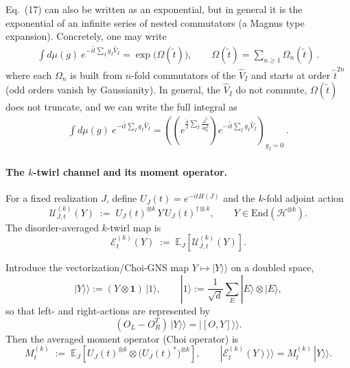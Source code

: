 \documentclass{article}
\theoremstyle{definition}
\newcommand{\lb}{\left(}
\newcommand{\rb}{\right)}
\newcommand{\p}{\partial}
\begin{document}
    Eq.~(17) can also be written as an exponential, but in general it is the exponential
    of an infinite series of nested commutators (a Magnus type expansion).
    Concretely, one may write
    \begin{eqnarray}
        \int d\mu(g)\:e^{-i\tilde{t}\sum_I g_I\hat{V}_I}=\exp\big(\Omega(\tilde{t})\big),\qquad
        \Omega(\tilde{t})=\sum_{n\geq 1}\Omega_n(\tilde{t})\ .
    \end{eqnarray}
    where each $\Omega_{n}$ is built from $n$-fold commutators of the $\hat{V}_{I}$
    and starts at order $\tilde{t}^{2n}$ (odd orders vanish by Gaussianity). In
    general, the $\hat{V}_{I}$ do not commute, $\Omega(\tilde{t})$ does not
    truncate, and we can write the full integral as
    \begin{eqnarray}
        \int d\mu(g)\:e^{-i\tilde{t}\sum_I g_I\hat{V}_I}=\lb \lb e^{\frac{\tilde{\sigma}}{2}\sum_I \frac{\p^{2}}{\p g^{2}_{I}}}\rb
        e^{-i \tilde{t}\sum_I g_I \hat{V}_I}\rb_{g_I=0}\ .
    \end{eqnarray}

    \paragraph{The $k$-twirl channel and its moment operator.}
    For a fixed realization $J$, define $U_{J}(t)=e^{-itH(J)}$ and the $k$-fold
    adjoint action
    \begin{equation}
        \mathcal{U}^{(k)}_{J,t}(Y)\;:=\;U_{J}(t)^{\otimes k}\,Y\,U_{J}(t)^{\dagger\otimes
        k}, \qquad Y\in \mathrm{End}(\mathcal{H}^{\otimes k}).
    \end{equation}
    The disorder-averaged $k$-twirl map is
    \begin{equation}
        \mathcal{E}^{(k)}_{t}(Y)\;:=\;\mathbb{E}_{J}\!\left[\mathcal{U}^{(k)}_{J,t}
        (Y)\right].
    \end{equation}

    Introduce the vectorization/Choi-GNS map $Y\mapsto |Y\rangle\rangle$ on a doubled
    space,
    \begin{equation}
        |Y\rangle\rangle := (Y\otimes \mathbf{1})\,|1\rangle, \qquad |1\rangle :=
        \frac{1}{\sqrt{d}}\sum_{E}|E\rangle\otimes |E\rangle,
    \end{equation}
    so that left- and right-actions are represented by
    \begin{equation}
        (O_{L}- O_{R}^{T})\,|Y\rangle\rangle = |[O,Y]\rangle\rangle.
    \end{equation}
    Then the averaged moment operator (Choi operator) is
    \begin{equation}
        M_{t}^{(k)}\;:=\;\mathbb{E}_{J}\!\left[U_{J}(t)^{\otimes k}\otimes \big(U
        _{J}(t)^{*}\big)^{\otimes k}\right], \qquad |\mathcal{E}_{t}^{(k)}(Y)\rangle
        \rangle = M_{t}^{(k)}\,|Y\rangle\rangle.
    \end{equation}
\end{document}
